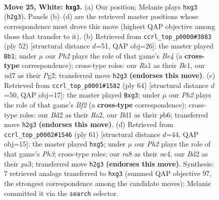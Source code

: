 \documentclass[11pt]{article}
\begin{document}
\clearpage

\begin{figure}[p]\centering
\begin{subfigure}{0.46\textwidth}\centering
\resizebox{\linewidth}{!}{%
\newchessgame
\chessboard[
  setfen={r1b3k1/3n4/1p4p1/2p2p2/2P2P2/p1P3p1/P2B3P/R2B2K1 w - - 0 25},
  showmover=false,
  pgfstyle=straightmove, color=movearrow, markmove={h2-g3}
]}
\caption{}
\end{subfigure}\hfill
\begin{subfigure}{0.46\textwidth}\centering
\resizebox{\linewidth}{!}{%
\newchessgame
\chessboard[
  setfen={3r2k1/4npp1/2b1p2p/1p2P2P/p3B3/8/PP3PPK/2B1R3 w - - 0 27},
  showmover=false,
  pgfstyle=straightmove, color=movearrow, markmove={e4-b1}
]}
\caption{}
\end{subfigure}
\\[4pt]
\begin{subfigure}{0.46\textwidth}\centering
\resizebox{\linewidth}{!}{%
\newchessgame
\chessboard[
  setfen={3r2k1/2p3p1/1p4n1/3Pp3/2P1p3/2P1P1pP/R4B2/6K1 w - - 0 33},
  showmover=false,
  pgfstyle=straightmove, color=movearrow, markmove={f2-g3}
]}
\caption{}
\end{subfigure}\hfill
\begin{subfigure}{0.46\textwidth}\centering
\resizebox{\linewidth}{!}{%
\newchessgame
\chessboard[
  setfen={5r2/2k5/p1p4p/3b1pP1/1PN1p3/P3P3/5PP1/2R3K1 b - - 0 31},
  showmover=false,
  pgfstyle=straightmove, color=movearrow, markmove={h6-g5}
]}
\caption{}
\end{subfigure}
\caption{\textbf{Move 25, White: \texttt{hxg3}.} (a) Our position; Melanie plays \texttt{hxg3} (\texttt{h2g3}). Panels (b)--(d) are the retrieved master positions whose correspondence most drove this move (highest QAP objective among those that transfer to it). (b) Retrieved from \texttt{ccrl\_top\_p0000\#3083} (ply 52) [structural distance $d$=51, QAP obj=26]: the master played \texttt{Bb1}; under $\mu$ our \emph{Ph2} plays the role of that game's \emph{Be4} (a \textbf{cross-type} correspondence); cross-type roles: our \emph{R}a1 as their \emph{B}c1, our \emph{n}d7 as their \emph{P}g2; transferred move \texttt{h2g3} \textbf{(endorses this move)}. (c) Retrieved from \texttt{ccrl\_top\_p0001\#1582} (ply 64) [structural distance $d$=50, QAP obj=17]: the master played \texttt{Bxg3}; under $\mu$ our \emph{Ph2} plays the role of that game's \emph{Bf2} (a \textbf{cross-type} correspondence); cross-type roles: our \emph{B}d2 as their \emph{R}a2, our \emph{B}d1 as their \emph{p}b6; transferred move \texttt{h2g3} \textbf{(endorses this move)}. (d) Retrieved from \texttt{ccrl\_top\_p0002\#1546} (ply 61) [structural distance $d$=44, QAP obj=15]: the master played \texttt{hxg5}; under $\mu$ our \emph{Ph2} plays the role of that game's \emph{Ph3}; cross-type roles: our \emph{r}a8 as their \emph{n}c4, our \emph{B}d2 as their \emph{p}a3; transferred move \texttt{h2g3} \textbf{(endorses this move)}. Synthesis: 7 retrieved analogs transferred to \texttt{hxg3} (summed QAP objective 97, the strongest correspondence among the candidate moves); Melanie committed it via the \texttt{search} selector.}
\label{fig:thought-m48}
\end{figure}
\end{document}

